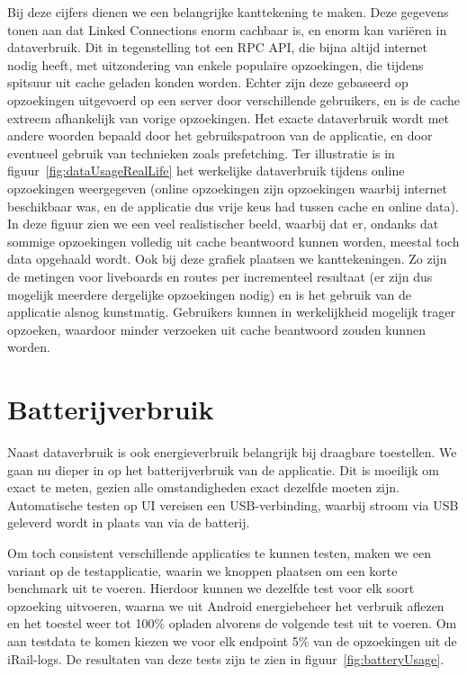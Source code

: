 Bij deze cijfers dienen we een belangrijke kanttekening te maken. Deze gegevens tonen aan dat Linked Connections enorm cachbaar is, en enorm kan variëren in dataverbruik. Dit in tegenstelling tot een RPC API, die bijna altijd internet nodig heeft, met uitzondering van enkele populaire opzoekingen, die tijdens spitsuur uit cache geladen konden worden. Echter zijn deze gebaseerd op opzoekingen uitgevoerd op een server door verschillende gebruikers, en is de cache extreem afhankelijk van vorige opzoekingen. Het exacte dataverbruik wordt met andere woorden bepaald door het gebruikspatroon van de applicatie, en door eventueel gebruik van technieken zoals prefetching. Ter illustratie is in figuur~\ref{fig:dataUsageRealLife} het werkelijke dataverbruik tijdens online opzoekingen weergegeven (online opzoekingen zijn opzoekingen waarbij internet beschikbaar was, en de applicatie dus vrije keus had tussen cache en online data). In deze figuur zien we een veel realistischer beeld, waarbij dat er, ondanks dat sommige opzoekingen volledig uit cache beantwoord kunnen worden, meestal toch data opgehaald wordt. Ook bij deze grafiek plaatsen we kanttekeningen. Zo zijn de metingen voor liveboards en routes per incrementeel resultaat (er zijn dus mogelijk meerdere dergelijke opzoekingen nodig) en is het gebruik van de applicatie alsnog kunstmatig. Gebruikers kunnen in werkelijkheid mogelijk trager opzoeken, waardoor minder verzoeken uit cache beantwoord zouden kunnen worden.


\section{Batterijverbruik}
Naast dataverbruik is ook energieverbruik belangrijk bij draagbare toestellen. We gaan nu dieper in op het batterijverbruik van de applicatie. Dit is moeilijk om exact te meten, gezien alle omstandigheden exact dezelfde moeten zijn. Automatische testen op UI vereisen een USB-verbinding, waarbij stroom via USB geleverd wordt in plaats van via de batterij. 

Om toch consistent verschillende applicaties te kunnen testen, maken we een variant op de testapplicatie, waarin we knoppen plaatsen om een korte benchmark uit te voeren. Hierdoor kunnen we dezelfde test voor elk soort opzoeking uitvoeren, waarna we uit Android energiebeheer het verbruik aflezen en het toestel weer tot 100\% opladen alvorens de volgende test uit te voeren. Om aan testdata te komen kiezen we voor elk endpoint 5\% van de opzoekingen uit de iRail-logs. De resultaten van deze tests zijn te zien in figuur~\ref{fig:batteryUsage}.

